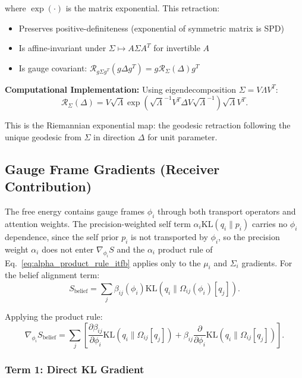 \documentclass[11pt]{article}
\begin{document}
where $\exp(\cdot)$ is the matrix exponential. This retraction:
\begin{itemize}
\item Preserves positive-definiteness (exponential of symmetric matrix is SPD)
\item Is affine-invariant under $\Sigma \mapsto A\Sigma A^T$ for invertible $A$
\item Is gauge covariant: $\mathcal{R}_{g\Sigma g^T}(g\Delta g^T) = g \mathcal{R}_{\Sigma}(\Delta) g^T$
\end{itemize}

\textbf{Computational Implementation:} Using eigendecomposition $\Sigma = V\Lambda V^T$:
\begin{equation}
\mathcal{R}_{\Sigma}(\Delta) = V \sqrt{\Lambda} \exp\left(\sqrt{\Lambda}^{-1} V^T \Delta V \sqrt{\Lambda}^{-1}\right) \sqrt{\Lambda} V^T.
\end{equation}

This is the Riemannian exponential map: the geodesic retraction following the unique geodesic from $\Sigma$ in direction $\Delta$ for unit parameter.

\subsection*{Gauge Frame Gradients (Receiver Contribution)}

The free energy contains gauge frames $\phi_i$ through both transport operators and attention weights. The precision-weighted self term $\alpha_i \mathrm{KL}(q_i \| p_i)$ carries no $\phi_i$ dependence, since the self prior $p_i$ is not transported by $\phi_i$, so the precision weight $\alpha_i$ does not enter $\nabla_{\phi_i} S$ and the $\alpha_i$ product rule of Eq.~\eqref{eq:alpha_product_rule_itfb} applies only to the $\mu_i$ and $\Sigma_i$ gradients. For the belief alignment term:
\begin{equation}
S_{\mathrm{belief}} = \sum_j \beta_{ij}(\phi_i)  \mathrm{KL}(q_i \| \Omega_{ij}(\phi_i)[q_j]).
\end{equation}

Applying the product rule:
\begin{equation}
\nabla_{\phi_i} S_{\mathrm{belief}} = \sum_j \left[ \frac{\partial \beta_{ij}}{\partial \phi_i} \mathrm{KL}(q_i \| \Omega_{ij}[q_j]) + \beta_{ij} \frac{\partial}{\partial \phi_i}\mathrm{KL}(q_i \| \Omega_{ij}[q_j]) \right].
\end{equation}

\subsubsection*{Term 1: Direct KL Gradient}
\end{document}
